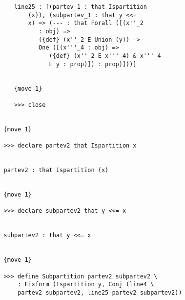 \documentclass[12pt]{article}
\begin{document}
\begin{verbatim}
      line25 : [(partev_1 : that Ispartition 
          (x)), (subpartev_1 : that y <<= 
          x) => (--- : that Forall ([(x''_2 
             : obj) => 
             ({def} (x''_2 E Union (y)) -> 
             One ([(x'''_4 : obj) => 
                ({def} (x''_2 E x'''_4) & x'''_4 
                E y : prop)]) : prop)]))]


      {move 1}

      >>> close


   {move 1}

   >>> declare partev2 that Ispartition x


   partev2 : that Ispartition (x)


   {move 1}

   >>> declare subpartev2 that y <<= x


   subpartev2 : that y <<= x


   {move 1}

   >>> define Subpartition partev2 subpartev2 \
       : Fixform (Ispartition y, Conj (line4 \
       partev2 subpartev2, line25 partev2 subpartev2))



\end{verbatim}
\end{document}
